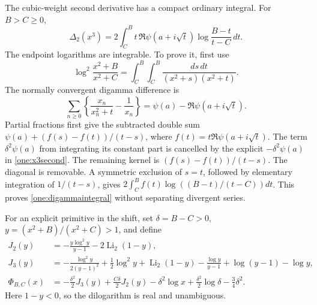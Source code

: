 \documentclass[11pt,a4paper]{article}
\numberwithin{equation}{section}
\theoremstyle{plain}
\theoremstyle{definition}
\theoremstyle{remark}
\DeclareMathOperator{\Li}{Li}
\begin{document}
The cubic-weight second derivative has a compact ordinary integral.
For $B>C\ge0$,
\begin{equation}\label{one:digammaintegral}
 \boxed{\displaystyle
 \Delta_2(x^3)=2\int_C^B
       t\,\Re\psi(a+i\sqrt t)
                       \log\frac{B-t}{t-C}\,dt.}
\end{equation}
The endpoint logarithms are integrable.  To prove it, first use
\[
 \log^2\frac{x^2+B}{x^2+C}
       =\int_C^B\!\int_C^B\frac{ds\,dt}{(x^2+s)(x^2+t)}.
\]
The normally convergent digamma difference is
\[
 \sum_{n\ge0}\left\{\frac{x_n}{x_n^2+t}-\frac1{x_n}\right\}
        =\psi(a)-\Re\psi(a+i\sqrt t).
\]
Partial fractions first give the subtracted double sum
$\psi(a)+(f(s)-f(t))/(t-s)$, where
$f(t)=t\Re\psi(a+i\sqrt t)$.  The term $\delta^2\psi(a)$
from integrating its constant part is cancelled by the explicit
$-\delta^2\psi(a)$ in \eqref{one:x3second}.  The remaining kernel is
$(f(s)-f(t))/(t-s)$.
The diagonal is removable.  A symmetric exclusion of $s=t$, followed
by elementary integration of $1/(t-s)$, gives
$2\int_C^B f(t)\log((B-t)/(t-C))dt$.  This proves
\eqref{one:digammaintegral} without separating divergent series.

For an explicit primitive in the shift, set $\delta=B-C>0$,
$y=(x^2+B)/(x^2+C)>1$, and define
\begin{align}
 J_2(y)&=-\frac{y\log^2y}{y-1}-2\Li_2(1-y),\label{one:J2}\\
 J_3(y)&=-\frac{\log^2y}{2(y-1)^2}+\frac12\log^2y
       +\Li_2(1-y)-\frac{\log y}{y-1}
       +\log(y-1)-\log y,\label{one:J3}\\
 \Phi_{B,C}(x)&=-\frac{\delta^2}{2}J_3(y)
       +\frac{C\delta}{2}J_2(y)-\delta^2\log x
       +\frac{\delta^2}{2}\log\delta-\frac34\delta^2.
       \label{one:Phi}
\end{align}
Here $1-y<0$, so the dilogarithm is real and unambiguous.
\end{document}
